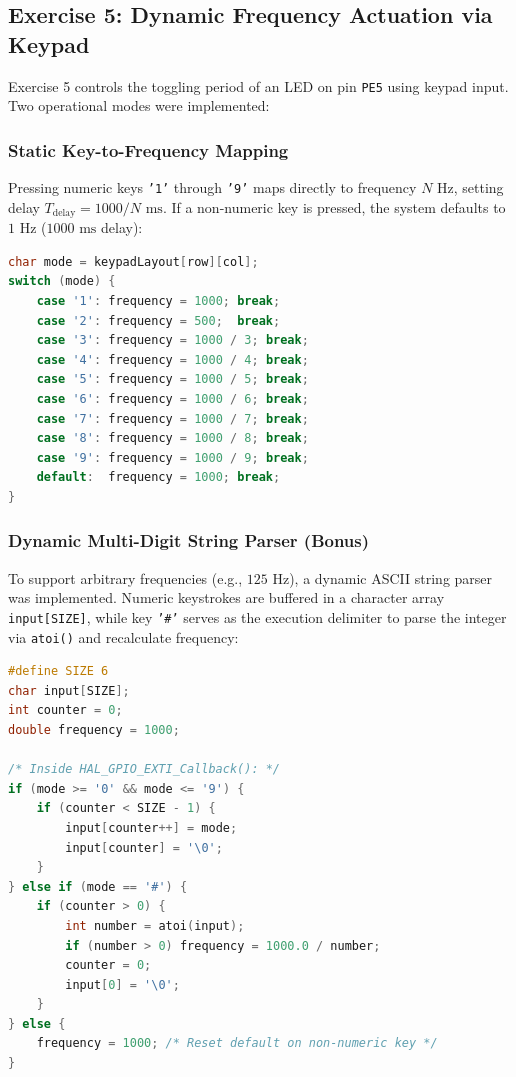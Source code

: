 \subsection{Exercise 5: Dynamic Frequency Actuation via Keypad}
Exercise 5 controls the toggling period of an LED on pin \texttt{PE5} using keypad input. Two operational modes were implemented:

\subsubsection{Static Key-to-Frequency Mapping}
Pressing numeric keys \texttt{'1'} through \texttt{'9'} maps directly to frequency $N\text{ Hz}$, setting delay $T_{\text{delay}} = 1000/N\text{ ms}$. If a non-numeric key is pressed, the system defaults to $1\text{ Hz}$ ($1000\text{ ms}$ delay):
\begin{lstlisting}[language=C]
char mode = keypadLayout[row][col];
switch (mode) {
    case '1': frequency = 1000; break;
    case '2': frequency = 500;  break;
    case '3': frequency = 1000 / 3; break;
    case '4': frequency = 1000 / 4; break;
    case '5': frequency = 1000 / 5; break;
    case '6': frequency = 1000 / 6; break;
    case '7': frequency = 1000 / 7; break;
    case '8': frequency = 1000 / 8; break;
    case '9': frequency = 1000 / 9; break;
    default:  frequency = 1000; break;
}
\end{lstlisting}

\subsubsection{Dynamic Multi-Digit String Parser (Bonus)}
To support arbitrary frequencies (e.g., $125\text{ Hz}$), a dynamic ASCII string parser was implemented. Numeric keystrokes are buffered in a character array \texttt{input[SIZE]}, while key \texttt{'\#'} serves as the execution delimiter to parse the integer via \texttt{atoi()} and recalculate frequency:

\begin{lstlisting}[language=C, caption={Dynamic multi-digit keypad input parsing engine.}, label={lst:ex5_hard}]
#define SIZE 6
char input[SIZE];
int counter = 0;
double frequency = 1000;

/* Inside HAL_GPIO_EXTI_Callback(): */
if (mode >= '0' && mode <= '9') {
    if (counter < SIZE - 1) {
        input[counter++] = mode;
        input[counter] = '\0';
    }
} else if (mode == '#') {
    if (counter > 0) {
        int number = atoi(input);
        if (number > 0) frequency = 1000.0 / number;
        counter = 0;
        input[0] = '\0';
    }
} else {
    frequency = 1000; /* Reset default on non-numeric key */
}
\end{lstlisting}

